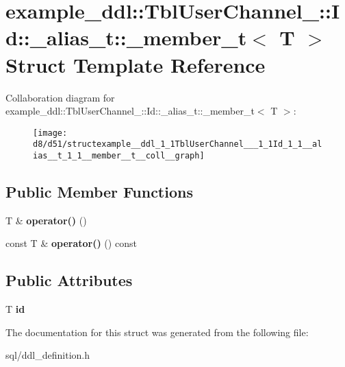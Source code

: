 \hypertarget{structexample__ddl_1_1TblUserChannel___1_1Id_1_1__alias__t_1_1__member__t}{}\section{example\+\_\+ddl\+:\+:Tbl\+User\+Channel\+\_\+\+:\+:Id\+:\+:\+\_\+alias\+\_\+t\+:\+:\+\_\+member\+\_\+t$<$ T $>$ Struct Template Reference}
\label{structexample__ddl_1_1TblUserChannel___1_1Id_1_1__alias__t_1_1__member__t}


Collaboration diagram for example\+\_\+ddl\+:\+:Tbl\+User\+Channel\+\_\+\+:\+:Id\+:\+:\+\_\+alias\+\_\+t\+:\+:\+\_\+member\+\_\+t$<$ T $>$\+:
\nopagebreak
\begin{figure}[H]
\begin{center}
\leavevmode
\texttt{[image: d8/d51/structexample\_\_ddl\_1\_1TblUserChannel\_\_\_1\_1Id\_1\_1\_\_alias\_\_t\_1\_1\_\_member\_\_t\_\_coll\_\_graph]}
\end{center}
\end{figure}
\subsection*{Public Member Functions}
\begin{DoxyCompactItemize}
\item 
\hypertarget{structexample__ddl_1_1TblUserChannel___1_1Id_1_1__alias__t_1_1__member__t_a858cfd2e73a9f52d13e729b9db113f54}{}T \& {\bfseries operator()} ()\label{structexample__ddl_1_1TblUserChannel___1_1Id_1_1__alias__t_1_1__member__t_a858cfd2e73a9f52d13e729b9db113f54}

\item 
\hypertarget{structexample__ddl_1_1TblUserChannel___1_1Id_1_1__alias__t_1_1__member__t_a00d59635eb0d30bb8c79db3bd12f7dab}{}const T \& {\bfseries operator()} () const \label{structexample__ddl_1_1TblUserChannel___1_1Id_1_1__alias__t_1_1__member__t_a00d59635eb0d30bb8c79db3bd12f7dab}

\end{DoxyCompactItemize}
\subsection*{Public Attributes}
\begin{DoxyCompactItemize}
\item 
\hypertarget{structexample__ddl_1_1TblUserChannel___1_1Id_1_1__alias__t_1_1__member__t_aa700ab72a5dbbe33535dc7ea2bd32d99}{}T {\bfseries id}\label{structexample__ddl_1_1TblUserChannel___1_1Id_1_1__alias__t_1_1__member__t_aa700ab72a5dbbe33535dc7ea2bd32d99}

\end{DoxyCompactItemize}


The documentation for this struct was generated from the following file\+:\begin{DoxyCompactItemize}
\item 
sql/ddl\+\_\+definition.\+h\end{DoxyCompactItemize}
